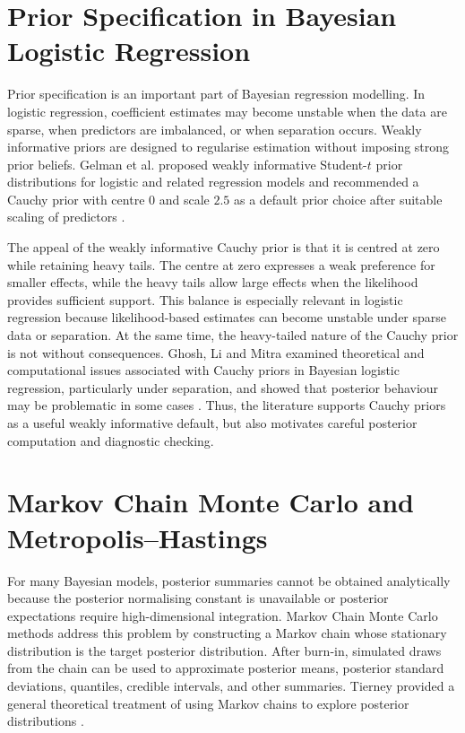 \section{Prior Specification in Bayesian Logistic Regression}

Prior specification is an important part of Bayesian regression modelling. In logistic regression, coefficient estimates may become unstable when the data are sparse, when predictors are imbalanced, or when separation occurs. Weakly informative priors are designed to regularise estimation without imposing strong prior beliefs. Gelman et al. proposed weakly informative Student-$t$ prior distributions for logistic and related regression models and recommended a Cauchy prior with centre $0$ and scale $2.5$ as a default prior choice after suitable scaling of predictors \cite{gelman2008weakly}.

The appeal of the weakly informative Cauchy prior is that it is centred at zero while retaining heavy tails. The centre at zero expresses a weak preference for smaller effects, while the heavy tails allow large effects when the likelihood provides sufficient support. This balance is especially relevant in logistic regression because likelihood-based estimates can become unstable under sparse data or separation. At the same time, the heavy-tailed nature of the Cauchy prior is not without consequences. Ghosh, Li and Mitra examined theoretical and computational issues associated with Cauchy priors in Bayesian logistic regression, particularly under separation, and showed that posterior behaviour may be problematic in some cases \cite{ghosh2015cauchy}. Thus, the literature supports Cauchy priors as a useful weakly informative default, but also motivates careful posterior computation and diagnostic checking.

\section{Markov Chain Monte Carlo and Metropolis--Hastings}

For many Bayesian models, posterior summaries cannot be obtained analytically because the posterior normalising constant is unavailable or posterior expectations require high-dimensional integration. Markov Chain Monte Carlo methods address this problem by constructing a Markov chain whose stationary distribution is the target posterior distribution. After burn-in, simulated draws from the chain can be used to approximate posterior means, posterior standard deviations, quantiles, credible intervals, and other summaries. Tierney provided a general theoretical treatment of using Markov chains to explore posterior distributions \cite{tierney1994markov}.

